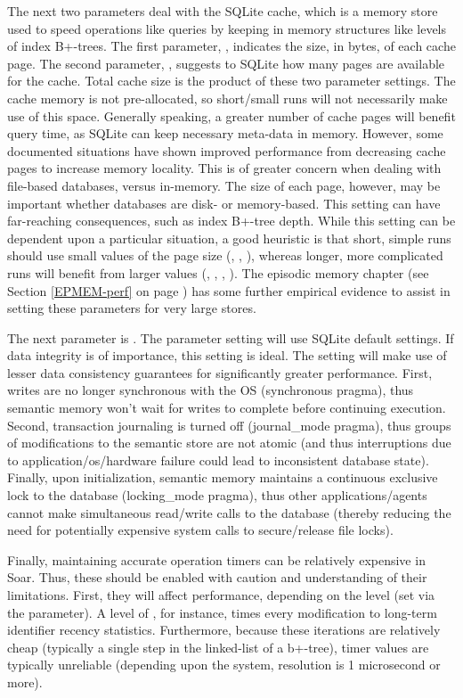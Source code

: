 The next two parameters deal with the SQLite cache, which is a memory store used to speed operations like queries by keeping in memory structures like levels of index B+-trees. 
The first parameter, , indicates the size, in bytes, of each cache page. 
The second parameter, , suggests to SQLite how many pages are available for the cache. 
Total cache size is the product of these two parameter settings. 
The cache memory is not pre-allocated, so short/small runs will not necessarily make use of this space. 
Generally speaking, a greater number of cache pages will benefit query time, as SQLite can keep necessary meta-data in memory. 
However, some documented situations have shown improved performance from decreasing cache pages to increase memory locality. 
This is of greater concern when dealing with file-based databases, versus in-memory. 
The size of each page, however, may be important whether databases are disk- or memory-based. 
This setting can have far-reaching consequences, such as index B+-tree depth. 
While this setting can be dependent upon a particular situation, a good heuristic is that short, simple runs should use small values of the page size (, , ), whereas longer, more complicated runs will benefit from larger values (, , , ). 
The episodic memory chapter (see Section \ref{EPMEM-perf} on page \pageref{EPMEM-perf}) has some further empirical evidence to assist in setting these parameters for very large stores.

The next parameter is .  
The  parameter setting will use SQLite default settings.  
If data integrity is of importance, this setting is ideal.  
The  setting will make use of lesser data consistency guarantees for significantly greater performance.  
First, writes are no longer synchronous with the OS (synchronous pragma), thus semantic memory won't wait for writes to complete before continuing execution.  
Second, transaction journaling is turned off (journal\_mode pragma), thus groups of modifications to the semantic store are not atomic (and thus interruptions due to application/os/hardware failure could lead to inconsistent database state).  
Finally, upon initialization, semantic memory maintains a continuous exclusive lock to the database (locking\_mode pragma), thus other applications/agents cannot make simultaneous read/write calls to the database (thereby reducing the need for potentially expensive system calls to secure/release file locks).

Finally, maintaining accurate operation timers can be relatively expensive in Soar.  
Thus, these should be enabled with caution and understanding of their limitations.  
First, they will affect performance, depending on the level (set via the  parameter).  
A level of , for instance, times every modification to long-term identifier recency statistics.  
Furthermore, because these iterations are relatively cheap (typically a single step in the linked-list of a b+-tree), timer values are typically unreliable (depending upon the system, resolution is 1 microsecond or more).

